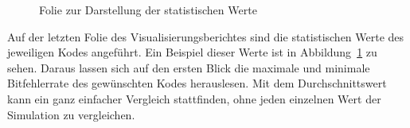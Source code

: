 \begin{figure}[th]
\centering
{}
\caption{Folie zur Darstellung der statistischen Werte}
\label{pic:ChannelcodingSimulationStatistic}
\end{figure}

\newpage
Auf der letzten Folie des Visualisierungsberichtes sind die statistischen Werte des jeweiligen Kodes angeführt. Ein Beispiel dieser Werte ist in Abbildung~\ref{pic:ChannelcodingSimulationStatistic} zu sehen. Daraus lassen sich auf den ersten Blick die maximale und minimale Bitfehlerrate des gewünschten Kodes herauslesen. Mit dem Durchschnittswert kann ein ganz einfacher Vergleich stattfinden, ohne jeden einzelnen Wert der Simulation zu vergleichen.

\FloatBarrier